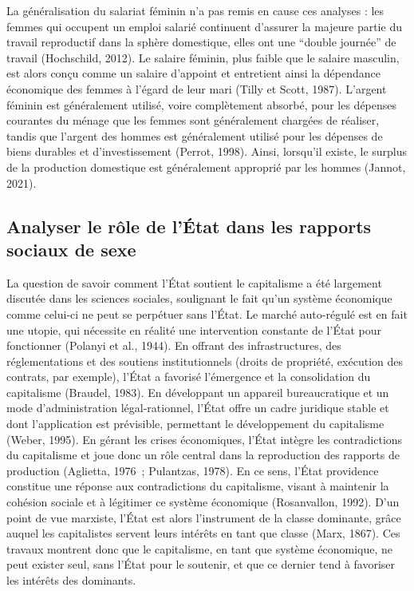 \documentclass[
  12pt,
]{book}
\begin{document}
La généralisation du salariat féminin n'a pas remis en cause ces
analyses : les femmes qui occupent un emploi salarié continuent
d'assurer la majeure partie du travail reproductif dans la sphère
domestique, elles ont une ``double journée'' de travail (Hochschild,
2012). Le salaire féminin, plus faible que le salaire masculin, est
alors conçu comme un salaire d'appoint et entretient ainsi la dépendance
économique des femmes à l'égard de leur mari (Tilly et Scott, 1987).
L'argent féminin est généralement utilisé, voire complètement absorbé,
pour les dépenses courantes du ménage que les femmes sont généralement
chargées de réaliser, tandis que l'argent des hommes est généralement
utilisé pour les dépenses de biens durables et d'investissement (Perrot,
1998). Ainsi, lorsqu'il existe, le surplus de la production domestique
est généralement approprié par les hommes (Jannot, 2021).

\subsection{Analyser le rôle de l'État dans les rapports sociaux de
sexe}\label{analyser-le-ruxf4le-de-luxe9tat-dans-les-rapports-sociaux-de-sexe}

La question de savoir comment l'État soutient le capitalisme a été
largement discutée dans les sciences sociales, soulignant le fait qu'un
système économique comme celui-ci ne peut se perpétuer sans l'État. Le
marché auto-régulé est en fait une utopie, qui nécessite en réalité une
intervention constante de l'État pour fonctionner (Polanyi et al.,
1944). En offrant des infrastructures, des réglementations et des
soutiens institutionnels (droits de propriété, exécution des contrats,
par exemple), l'État a favorisé l'émergence et la consolidation du
capitalisme (Braudel, 1983). En développant un appareil bureaucratique
et un mode d'administration légal-rationnel, l'État offre un cadre
juridique stable et dont l'application est prévisible, permettant le
développement du capitalisme (Weber, 1995). En gérant les crises
économiques, l'État intègre les contradictions du capitalisme et joue
donc un rôle central dans la reproduction des rapports de production
(Aglietta, 1976~; Pulantzas, 1978). En ce sens, l'État providence
constitue une réponse aux contradictions du capitalisme, visant à
maintenir la cohésion sociale et à légitimer ce système économique
(Rosanvallon, 1992). D'un point de vue marxiste, l'État est alors
l'instrument de la classe dominante, grâce auquel les capitalistes
servent leurs intérêts en tant que classe (Marx, 1867). Ces travaux
montrent donc que le capitalisme, en tant que système économique, ne
peut exister seul, sans l'État pour le soutenir, et que ce dernier tend
à favoriser les intérêts des dominants.
\end{document}
